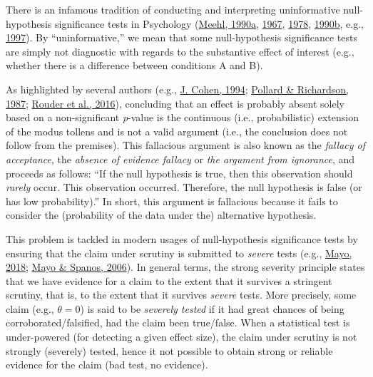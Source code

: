 \documentclass[
  english,
  man, donotrepeattitle,floatsintext]{apa6}
\begin{document}
There is an infamous tradition of conducting and interpreting uninformative null-hypothesis significance tests in Psychology (\protect\hyperlink{ref-meehl_appraising_1990-1}{Meehl, 1990a}, \protect\hyperlink{ref-meehl_theory-testing_1967}{1967}, \protect\hyperlink{ref-meehl_theoretical_1978}{1978}, \protect\hyperlink{ref-meehl_why_1990}{1990b}, e.g., \protect\hyperlink{ref-harlow_problem_1997}{1997}). By ``uninformative,'' we mean that some null-hypothesis significance tests are simply not diagnostic with regards to the substantive effect of interest (e.g., whether there is a difference between conditions A and B).

As highlighted by several authors (e.g., \protect\hyperlink{ref-cohen_earth_1994}{J. Cohen, 1994}; \protect\hyperlink{ref-pollard_probability_1987}{Pollard \& Richardson, 1987}; \protect\hyperlink{ref-rouder_is_2016}{Rouder et al., 2016}), concluding that an effect is probably absent solely based on a non-significant \emph{p}-value is the continuous (i.e., probabilistic) extension of the modus tollens and is not a valid argument (i.e., the conclusion does not follow from the premises). This fallacious argument is also known as the \emph{fallacy of acceptance}, the \emph{absence of evidence fallacy} or \emph{the argument from ignorance}, and proceeds as follows: ``If the null hypothesis is true, then this observation should \emph{rarely} occur. This observation occurred. Therefore, the null hypothesis is false (or has low probability).'' In short, this argument is fallacious because it fails to consider the (probability of the data under the) alternative hypothesis.

This problem is tackled in modern usages of null-hypothesis significance tests by ensuring that the claim under scrutiny is submitted to \emph{severe} tests (e.g., \protect\hyperlink{ref-mayo_statistical_2018}{Mayo, 2018}; \protect\hyperlink{ref-mayo_severe_2006}{Mayo \& Spanos, 2006}). In general terms, the strong severity principle states that we have evidence for a claim to the extent that it survives a stringent scrutiny, that is, to the extent that it survives \emph{severe} tests. More precisely, some claim (e.g., \(\theta = 0\)) is said to be \emph{severely tested} if it had great chances of being corroborated/falsified, had the claim been true/false. When a statistical test is under-powered (for detecting a given effect size), the claim under scrutiny is not strongly (severely) tested, hence it not possible to obtain strong or reliable evidence for the claim (bad test, no evidence).
\end{document}
